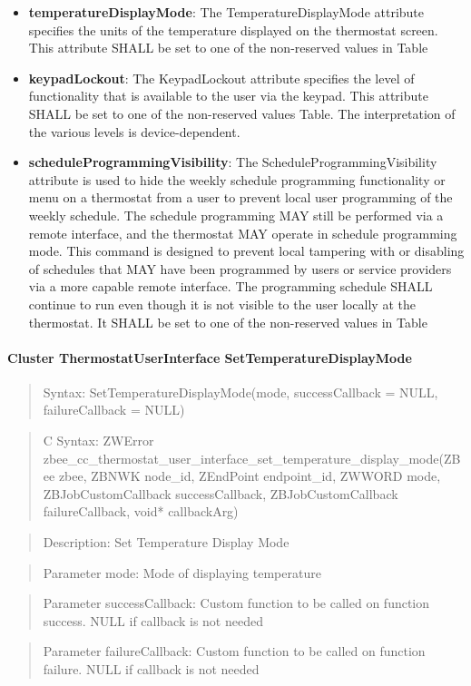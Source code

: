 \begin{itemize}
\item \textbf{temperatureDisplayMode}: The TemperatureDisplayMode attribute specifies the units of the temperature displayed on the thermostat screen. This attribute SHALL be set to one of the non-reserved values in Table
\item \textbf{keypadLockout}: The KeypadLockout attribute specifies the level of functionality that is available to the user via the keypad. This attribute SHALL be set to one of the non-reserved values Table. The interpretation of the various levels is device-dependent.
\item \textbf{scheduleProgrammingVisibility}: The ScheduleProgrammingVisibility attribute is used to hide the weekly schedule programming functionality or menu on a thermostat from a user to prevent local user programming of the weekly schedule. The schedule programming MAY still be performed via a remote interface, and the thermostat MAY operate in schedule programming mode. This command is designed to prevent local tampering with or disabling of schedules that MAY have been programmed by users or service providers via a more capable remote interface. The programming schedule SHALL continue to run even though it is not visible to the user locally at the thermostat. It SHALL be set to one of the non-reserved values in Table
\end{itemize}

\paragraph{Cluster ThermostatUserInterface SetTemperatureDisplayMode}
\begin{quote}Syntax: SetTemperatureDisplayMode(mode, successCallback = NULL, failureCallback = NULL)\end{quote}
\begin{quote}C Syntax: ZWError zbee\_cc\_thermostat\_user\_interface\_set\_temperature\_display\_mode(ZBee zbee, ZBNWK node\_id, ZEndPoint endpoint\_id, ZWWORD mode, ZBJobCustomCallback successCallback, ZBJobCustomCallback failureCallback, void* callbackArg)\end{quote}
\begin{quote}Description: Set Temperature Display Mode\end{quote}
\begin{quote}Parameter mode: Mode of displaying temperature\end{quote}
\begin{quote}Parameter successCallback: Custom function to be called on function success. NULL if callback is not needed\end{quote}
\begin{quote}Parameter failureCallback: Custom function to be called on function failure. NULL if callback is not needed\end{quote}



